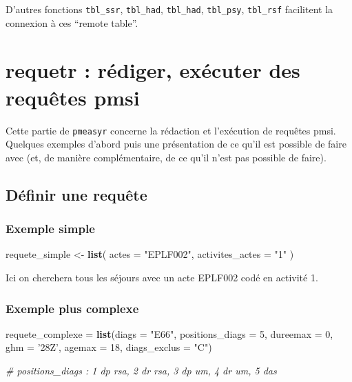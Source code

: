 \documentclass[]{book}
\newenvironment{Shaded}{\begin{snugshade}}{\end{snugshade}}
\newcommand{\KeywordTok}[1]{\textcolor[rgb]{0.13,0.29,0.53}{\textbf{#1}}}
\newcommand{\DataTypeTok}[1]{\textcolor[rgb]{0.13,0.29,0.53}{#1}}
\newcommand{\DecValTok}[1]{\textcolor[rgb]{0.00,0.00,0.81}{#1}}
\newcommand{\StringTok}[1]{\textcolor[rgb]{0.31,0.60,0.02}{#1}}
\newcommand{\CommentTok}[1]{\textcolor[rgb]{0.56,0.35,0.01}{\textit{#1}}}
\newcommand{\NormalTok}[1]{#1}
\begin{document}
D'autres fonctions \texttt{tbl\_ssr}, \texttt{tbl\_had},
\texttt{tbl\_had}, \texttt{tbl\_psy}, \texttt{tbl\_rsf} facilitent la
connexion à ces ``remote table''.

\chapter{requetr : rédiger, exécuter des requêtes
pmsi}\label{requetr-rediger-executer-des-requetes-pmsi}

Cette partie de \texttt{pmeasyr} concerne la rédaction et l'exécution de
requêtes pmsi. Quelques exemples d'abord puis une présentation de ce
qu'il est possible de faire avec (et, de manière complémentaire, de ce
qu'il n'est pas possible de faire).

\section{Définir une requête}\label{definir-une-requete}

\subsection{Exemple simple}\label{exemple-simple}

\begin{Shaded}
\begin{Highlighting}[]
\NormalTok{requete_simple <-}\StringTok{ }\KeywordTok{list}\NormalTok{(}
  \DataTypeTok{actes =} \StringTok{"EPLF002"}\NormalTok{, }
  \DataTypeTok{activites_actes =} \StringTok{"1"}
\NormalTok{)}
\end{Highlighting}
\end{Shaded}

Ici on cherchera tous les séjours avec un acte EPLF002 codé en activité
1.

\subsection{Exemple plus complexe}\label{exemple-plus-complexe}

\begin{Shaded}
\begin{Highlighting}[]
\NormalTok{requete_complexe =}\StringTok{ }\KeywordTok{list}\NormalTok{(}\DataTypeTok{diags =} \StringTok{"E66"}\NormalTok{, }
                        \DataTypeTok{positions_diags =} \DecValTok{5}\NormalTok{, }
                        \DataTypeTok{dureemax =} \DecValTok{0}\NormalTok{,}
                        \DataTypeTok{ghm =} \StringTok{'28Z'}\NormalTok{,}
                        \DataTypeTok{agemax =} \DecValTok{18}\NormalTok{,}
                        \DataTypeTok{diags_exclus =} \StringTok{"C"}\NormalTok{)}

\CommentTok{# positions_diags : 1 dp rsa, 2 dr rsa, 3 dp um, 4 dr um, 5 das}
\end{Highlighting}
\end{Shaded}
\end{document}
